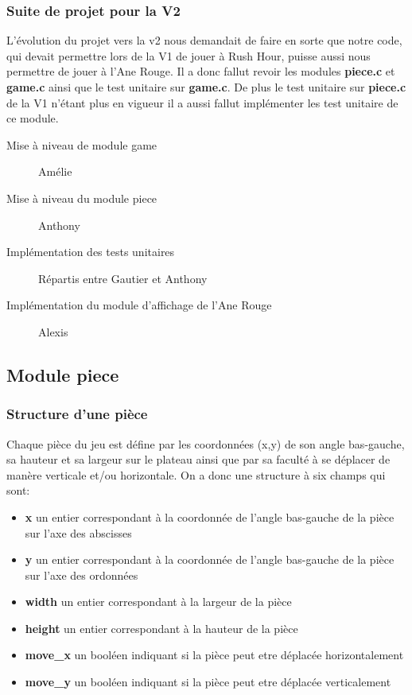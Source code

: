 \documentclass{report}
\begin{document}
\subsubsection*{Suite de projet pour la V2}
L'évolution du projet vers la v2 nous demandait de faire en sorte que notre code, qui devait permettre lors de la V1 de jouer à Rush Hour, puisse aussi nous permettre de jouer à l'Ane Rouge. Il a donc fallut revoir les modules \textbf{piece.c} et \textbf{game.c} ainsi que le test unitaire sur \textbf{game.c}. De plus le test unitaire sur \textbf{piece.c} de la V1 n'étant plus en vigueur il a aussi fallut implémenter les test unitaire de ce module.
\begin{description}
\item [Mise à niveau de module game] Amélie
\item [Mise à niveau du module piece] Anthony
\item [Implémentation des tests unitaires] Répartis entre Gautier et Anthony
\item [Implémentation du module d'affichage de l'Ane Rouge] Alexis
\end{description}

\subsection{Module piece}
\subsubsection*{Structure d'une pièce}
Chaque pièce du jeu est défine par les coordonnées (x,y) de son angle bas-gauche, sa hauteur et sa largeur sur le plateau ainsi que par sa faculté à se déplacer de manère verticale et/ou horizontale.
On a donc une structure à six champs qui sont:
\begin{itemize}
\item \textbf{x} un entier correspondant à la coordonnée de l'angle bas-gauche de la pièce sur l'axe des abscisses
\item \textbf{y} un entier correspondant à la coordonnée de l'angle bas-gauche de la pièce sur l'axe des ordonnées
\item \textbf{width} un entier correspondant à la largeur de la pièce
\item \textbf{height} un entier correspondant à la hauteur de la pièce
\item \textbf{move\_x} un booléen indiquant si la pièce peut etre déplacée horizontalement
\item \textbf{move\_y} un booléen indiquant si la pièce peut etre déplacée verticalement
\end{itemize} 
\end{document}
